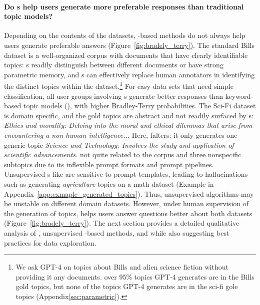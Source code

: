 
\paragraph{Do \mm{}s help users generate more preferable responses than traditional topic models?} 
%
Depending on the contents of the datasets, \mm{}-based methods do
not always help users generate preferable answers
(Figure~\ref{fig:bradely_terry}).
%
The standard Bills dataset is a well-organized corpus with documents
that have clearly identifiable topics:
%
%
\mm{}s readily distinguish
between different documents or \mm{} have strong parametric memory, and \mm{}s can effectively replace human
annotators in identifying the distinct topics within the dataset.\footnote{We ask GPT-4 on topics about Bills and alien science fiction without providing it any documents. over 95\% topics GPT-4 generates are in the Bills gold topics, but none of the topics GPT-4 generates are in the sci-fi gole topics (Appendix\ref{sec:parametric}).}
%
For easy data sets that need simple classification, all user groups involving \mm{}s generate
better responses than keyword-based topic models (),
with higher Bradley-Terry probabilities.
%
The Sci-Fi dataset is domain specific, and the gold topics are abstract and not
readily surfaced by \mm{}s: \textit{Ethics and morality: Delving into the moral and ethical dilemmas that arise from encountering a non-human intelligence...}
%
Here, \topicgpt{} falters: \colorbox{green!15}{it only generates one generic topic} \textit{Science and Technology: Involves the study and application of scientific advancements.} not
quite related to the corpus and three nonspecific subtopics due to its
inflexible prompt formats and prompt pipelines. 
%
Unsupervised \mm{}s like \topicgpt{} are sensitive to prompt templates, leading to hallucinations such as \colorbox{green!15}{generating \textit{agriculture} topics on a math dataset} (Example in Appendix~\ref{app:exmaple_generated_topics}).
%
Thus, unsupervised \mm{} algorithms may be unstable on different domain datasets.
%
However, under human supervision of the generation of \mm{} topics,
\mm{} helps users answer questions better about both datasets
(Figure~\ref{fig:bradely_terry}).
%
The next section provides a detailed qualitative analysis of \bass{},
unsupervised \mm{}-based methods, and  while also suggesting best
practices for data exploration.

